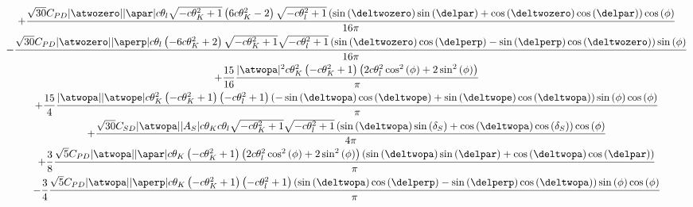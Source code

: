 %
{\footnotesize
\begin{multline}
+\frac{\sqrt{30} C_{{PD}} |\atwozero| |\apar| c\theta_{l} \sqrt{- c\theta_{K}^{2} + 1} \left(6 c\theta_{K}^{2} -2\right) \sqrt{- c\theta_{l}^{2} + 1} \left(\operatorname{sin}\left(\deltwozero\right) \operatorname{sin}\left(\delpar\right) 
+ \operatorname{cos}\left(\deltwozero\right) \operatorname{cos}\left(\delpar\right)\right) \operatorname{cos}\left(\phi\right)}{16 \pi} \\
- \frac{\sqrt{30} C_{{PD}} |\atwozero| |\aperp| c\theta_{l} \left(- 6 c\theta_{K}^{2} + 2\right) \sqrt{- c\theta_{K}^{2} + 1} \sqrt{- c\theta_{l}^{2} + 1} \left(\operatorname{sin}\left(\deltwozero\right) \operatorname{cos}\left(\delperp\right) - \operatorname{sin}\left(\delperp\right) \operatorname{cos}\left(\deltwozero\right)\right) \operatorname{sin}\left(\phi\right)}{16 \pi} \\
+\frac{15}{16} \frac{|\atwopa|^{2} c\theta_{K}^{2} \left(- c\theta_{K}^{2} + 1\right) \left(2 c\theta_{l}^{2} \operatorname{cos}^{2}\left(\phi\right) + 2 \operatorname{sin}^{2}\left(\phi\right)\right)}{\pi} \\
+\frac{15}{4} \frac{|\atwopa| |\atwope| c\theta_{K}^{2} \left(- c\theta_{K}^{2} + 1\right) \left(- c\theta_{l}^{2} + 1\right) \left(- \operatorname{sin}\left(\deltwopa\right) \operatorname{cos}\left(\deltwope\right) + \operatorname{sin}\left(\deltwope\right) \operatorname{cos}\left(\deltwopa\right)\right) \operatorname{sin}\left(\phi\right) \operatorname{cos}\left(\phi\right)}{\pi} \\ 
+\frac{\sqrt{30} C_{{SD}} |\atwopa| |A_{S}| c\theta_{K} c\theta_{l} \sqrt{- c\theta_{K}^{2} + 1} \sqrt{- c\theta_{l}^{2} + 1} \left(\operatorname{sin}\left(\deltwopa\right) \operatorname{sin}\left(\delta_{S}\right) + \operatorname{cos}\left(\deltwopa\right) \operatorname{cos}\left(\delta_{S}\right)\right) \operatorname{cos}\left(\phi\right)}{4 \pi} \\ 
+\frac{3}{8} \frac{\sqrt{5} C_{{PD}} |\atwopa| |\apar| c\theta_{K} \left(- c\theta_{K}^{2} + 1\right) \left(2 c\theta_{l}^{2} \operatorname{cos}^{2}\left(\phi\right) + 2 \operatorname{sin}^{2}\left(\phi\right)\right) \left(\operatorname{sin}\left(\deltwopa\right) \operatorname{sin}\left(\delpar\right) + \operatorname{cos}\left(\deltwopa\right) \operatorname{cos}\left(\delpar\right)\right)}{\pi} \\   - \frac{3}{4} \frac{\sqrt{5} C_{{PD}} |\atwopa| |\aperp| c\theta_{K} \left(- c\theta_{K}^{2} + 1\right) \left(- c\theta_{l}^{2} + 1\right) \left(\operatorname{sin}\left(\deltwopa\right) \operatorname{cos}\left(\delperp\right) - \operatorname{sin}\left(\delperp\right) \operatorname{cos}\left(\deltwopa\right)\right) \operatorname{sin}\left(\phi\right) \operatorname{cos}\left(\phi\right)}{\pi} \\ 

\end{multline}}
